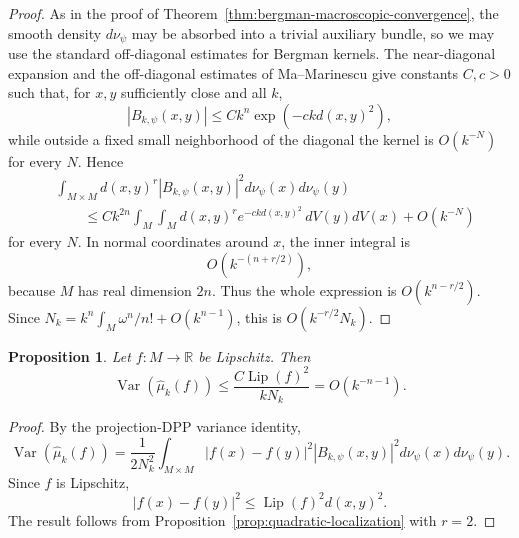 \documentclass[12pt,a4paper,reqno]{article}
\theoremstyle{thmstyleone}
\newtheorem{proposition}[theorem]{Proposition}
\theoremstyle{thmstylethree}
\theoremstyle{thmstyletwo}
\numberwithin{equation}{subsection}
\def\leq{\leqslant}
\begin{document}
\begin{proof}
As in the proof of Theorem~\ref{thm:bergman-macroscopic-convergence}, the smooth density $d\nu_\psi$ may be absorbed into a trivial auxiliary bundle, so we may use the standard off-diagonal estimates for Bergman kernels. The near-diagonal expansion and the off-diagonal estimates of Ma--Marinescu 
\cite[Thms.~4.1.24 and~4.2.1]{MaMa} give constants $C,c>0$ such that, for $x,y$ sufficiently close and all $k$,
\[
    |B_{k,\psi}(x,y)|
    \leq
    Ck^n\exp(-ckd(x,y)^2),
\]
while outside a fixed small neighborhood of the diagonal the kernel is $O(k^{-N})$ for every $N$. Hence
\[
\begin{aligned}
&\int_{M\times M}
    d(x,y)^r |B_{k,\psi}(x,y)|^2
    d\nu_\psi(x)d\nu_\psi(y) \\
&\qquad \leq
    Ck^{2n}\int_M\int_M d(x,y)^r e^{-ckd(x,y)^2}\,dV(y)dV(x)
    +O(k^{-N})
\end{aligned}
\]
for every $N$. In normal coordinates around $x$, the inner integral is
\[
    O\left(k^{-(n+r/2)}\right),
\]
because $M$ has real dimension $2n$. Thus the whole expression is $O(k^{n-r/2})$. Since $N_k=k^n\int_M\omega^n/n!+O(k^{n-1})$, this is $O(k^{-r/2}N_k)$.
\end{proof}

\begin{proposition}\label{prop:bergman-variance-lipschitz}
Let $f:M\to\mathbb R$ be Lipschitz. Then
\[
    \operatorname{Var}(\widehat\mu_k(f))
    \leq
    \frac{C\operatorname{Lip}(f)^2}{kN_k}
    =
    O(k^{-n-1}).
\]
\end{proposition}

\begin{proof}
By the projection-DPP variance identity,
\[
    \operatorname{Var}\left(\widehat\mu_k(f)\right)
    =
    \frac1{2N_k^2}
    \int_{M\times M}
        |f(x)-f(y)|^2 |B_{k,\psi}(x,y)|^2
        d\nu_\psi(x)d\nu_\psi(y).
\]
Since $f$ is Lipschitz,
\[
    |f(x)-f(y)|^2\leq \operatorname{Lip}(f)^2 d(x,y)^2.
\]
The result follows from Proposition~\ref{prop:quadratic-localization} with $r=2$.
\end{proof}

\end{document}

